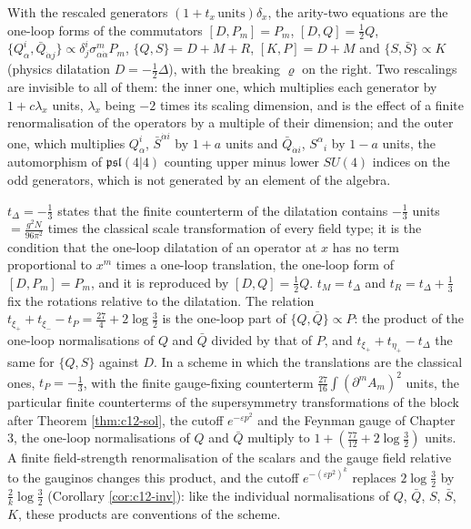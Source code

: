 \begin{remark}
With the rescaled generators $(1+t_x\,\text{units})\delta_x$, the arity-two equations are the one-loop forms of the commutators $[D,P_m]=P_m$, $[D,Q]=\tfrac12Q$, $\{Q^i_\alpha,\bar Q_{\dot\alpha j}\}\propto\delta^i_j\sigma^m_{\alpha\dot\alpha}P_m$, $\{Q,S\}=D+M+R$, $[K,P]=D+M$ and $\{S,\bar S\}\propto K$ (physics dilatation $D=-\tfrac12\Delta$), with the breaking $\varrho$ on the right. Two rescalings are invisible to all of them: the inner one, which multiplies each generator by $1+c\lambda_x$ units, $\lambda_x$ being $-2$ times its scaling dimension, and is the effect of a finite renormalisation of the operators by a multiple of their dimension; and the outer one, which multiplies $Q^i_\alpha$, $\bar S^{\dot\alpha i}$ by $1+a$ units and $\bar Q_{\dot\alpha i}$, $S^\alpha{}_i$ by $1-a$ units, the automorphism of $\mathfrak{psl}(4|4)$ counting upper minus lower $SU(4)$ indices on the odd generators, which is not generated by an element of the algebra.
\end{remark}

\begin{remark}
$t_\Delta=-\tfrac13$ states that the finite counterterm of the dilatation contains $-\tfrac13$ units $=\tfrac{g^2N}{96\pi^2}$ times the classical scale transformation of every field type; it is the condition that the one-loop dilatation of an operator at $x$ has no term proportional to $x^m$ times a one-loop translation, the one-loop form of $[D,P_m]=P_m$, and it is reproduced by $[D,Q]=\tfrac12Q$. $t_M=t_\Delta$ and $t_R=t_\Delta+\tfrac13$ fix the rotations relative to the dilatation. The relation $t_{\xi_+}+t_{\xi_-}-t_P=\tfrac{27}4+2\log\tfrac32$ is the one-loop part of $\{Q,\bar Q\}\propto P$: the product of the one-loop normalisations of $Q$ and $\bar Q$ divided by that of $P$, and $t_{\xi_+}+t_{\eta_+}-t_\Delta$ the same for $\{Q,S\}$ against $D$. In a scheme in which the translations are the classical ones, $t_P=-\tfrac13$, with the finite gauge-fixing counterterm $\tfrac{27}{16}\int(\partial^mA_m)^2$ units, the particular finite counterterms of the supersymmetry transformations of the block after Theorem \ref{thm:c12-sol}, the cutoff $e^{-\varepsilon p^2}$ and the Feynman gauge of Chapter 3, the one-loop normalisations of $Q$ and $\bar Q$ multiply to $1+(\tfrac{77}{12}+2\log\tfrac32)$ units. A finite field-strength renormalisation of the scalars and the gauge field relative to the gauginos changes this product, and the cutoff $e^{-(\varepsilon p^2)^k}$ replaces $2\log\tfrac32$ by $\tfrac2k\log\tfrac32$ (Corollary \ref{cor:c12-inv}): like the individual normalisations of $Q$, $\bar Q$, $S$, $\bar S$, $K$, these products are conventions of the scheme.
\end{remark}

